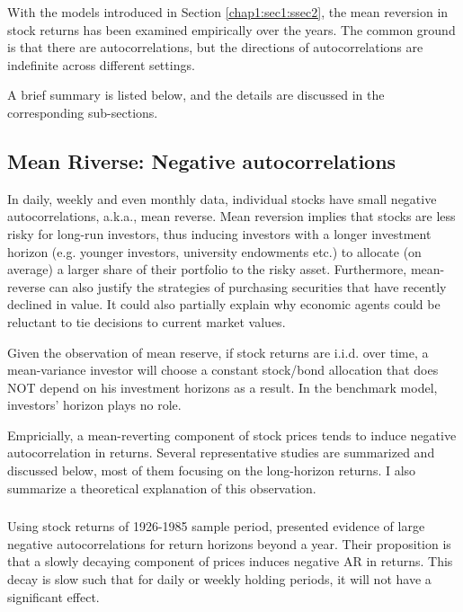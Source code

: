 With the models introduced in Section \ref{chap1:sec1:ssec2}, the mean reversion in stock returns
has been examined empirically over the years. The common ground is that there are autocorrelations,
but the directions of autocorrelations are indefinite across different settings.

A brief summary is listed below, and the details are discussed in the corresponding sub-sections.

\subsection{Mean Riverse: Negative autocorrelations}\label{chap1:sec2:ssec1}
In daily, weekly and even monthly data, individual stocks have small negative autocorrelations, a.k.a., mean reverse. Mean reversion implies that
stocks are less risky for long-run investors, thus inducing investors with a longer investment horizon (e.g. younger investors, university endowments etc.) to allocate (on average)
a larger share of their portfolio to the risky asset. Furthermore, mean-reverse can also justify the strategies of purchasing securities that have recently declined in value. It could also
partially explain why economic agents could be reluctant to tie decisions to current market values.

Given the observation of mean reserve, if stock returns are i.i.d. over time, a mean-variance investor will choose a constant stock/bond allocation that does NOT depend on his investment horizons as a result.
In the benchmark model, investors' horizon plays no role.

Empricially, a mean-reverting component of stock prices tends to induce negative autocorrelation in returns. Several representative studies are summarized and discussed below, most of them focusing on the long-horizon returns.
I also summarize a theoretical explanation of this observation.

\subsubsection{\citet{fama1988permanent}}\label{chap1:sec2:ssec1:paper1}
Using stock returns of 1926-1985 sample period, \citeauthor{fama1988permanent} presented evidence of large negative autocorrelations for return horizons beyond a year. Their proposition is that a slowly decaying component of prices
induces negative AR in returns. This decay is slow such that for daily or weekly holding periods, it will not have a significant effect. 

